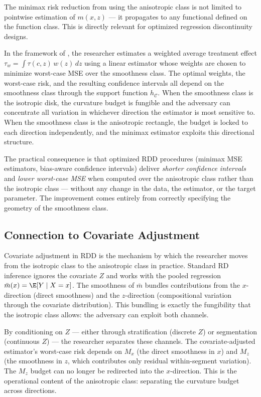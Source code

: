The minimax risk reduction from using the anisotropic class is not limited to pointwise estimation of $m(x,z)$ --- it propagates to any functional defined on the function class.
This is directly relevant for optimized regression discontinuity designs.

In the framework of \textcite{imbens_optimized_2019}, the researcher estimates a weighted average treatment effect $\tau_w = \int \tau(c, z)\, w(z)\, dz$ using a linear estimator whose weights are chosen to minimize worst-case MSE over the smoothness class.
The optimal weights, the worst-case risk, and the resulting confidence intervals all depend on the smoothness class through the support function $h_{\mathcal{C}}$.
When the smoothness class is the isotropic disk, the curvature budget is fungible and the adversary can concentrate all variation in whichever direction the estimator is most sensitive to.
When the smoothness class is the anisotropic rectangle, the budget is locked to each direction independently, and the minimax estimator exploits this directional structure.

The practical consequence is that optimized RDD procedures (minimax MSE estimators, bias-aware confidence intervals) deliver \emph{shorter confidence intervals} and \emph{lower worst-case MSE} when computed over the anisotropic class rather than the isotropic class --- without any change in the data, the estimator, or the target parameter.
The improvement comes entirely from correctly specifying the geometry of the smoothness class.


\subsection{Connection to Covariate Adjustment}\label{sec:overview:covariate_adjustment}

Covariate adjustment in RDD is the mechanism by which the researcher moves from the isotropic class to the anisotropic class in practice.
Standard RD inference ignores the covariate $Z$ and works with the pooled regression $\bar{m}(x) = \E[Y \mid X = x]$.
The smoothness of $\bar{m}$ bundles contributions from the $x$-direction (direct smoothness) and the $z$-direction (compositional variation through the covariate distribution).
This bundling is exactly the fungibility that the isotropic class allows: the adversary can exploit both channels.

By conditioning on $Z$ --- either through stratification (discrete $Z$) or segmentation (continuous $Z$) --- the researcher separates these channels.
The covariate-adjusted estimator's worst-case risk depends on $M_x$ (the direct smoothness in $x$) and $M_z$ (the smoothness in $z$, which contributes only residual within-segment variation).
The $M_z$ budget can no longer be redirected into the $x$-direction.
This is the operational content of the anisotropic class: separating the curvature budget across directions.


